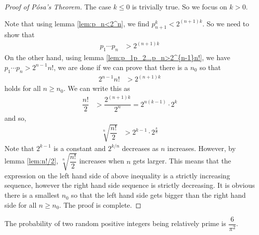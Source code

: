\documentclass{subfiles}
\begin{document}
	\begin{proof}[Proof of P\'osa's Theorem]
		The case $k\leq0$ is trivially true. So we focus on $k>0$.

		Note that using lemma \eqref{lem:p_n<2^n}, we find $p_{n+1}^k<2^{(n+1)k}$. So we need to show that
			\begin{align*}
				p_1\cdots p_n & > 2^{(n+1)k}
			\end{align*}
		On the other hand, using lemma \eqref{lem:p_1p_2...p_n>2^{n-1}n!}, we have $p_1\cdots p_n > 2^{n-1}n!$, we are done if we can prove that there is a $n_0$ so that
			\begin{align*}
				2^{n-1}n! & >2^{(n+1)k}
			\end{align*}
		holds for all $n\geq n_0$. We can write this as
			\begin{align*}
				\dfrac{n!}{2} & >\dfrac{2^{(n+1)k}}{2^n} =2^{n(k-1)}\cdot2^k
			\end{align*}
		and so,
			\begin{align*}
				\sqrt[n]{\dfrac{n!}{2}}&>2^{k-1}\cdot2^{\frac{k}{n}}
			\end{align*}
		Note that $2^{k-1}$ is a constant and $2^{k/n}$ decreases as $n$ increases. However, by lemma \eqref{lem:n!/2}, $\sqrt[n]{\dfrac{n!}{2}}$ increases when $n$ gets larger. This means that the expression on the left hand side of above inequality is a strictly increasing sequence, however the right hand side sequence is strictly decreasing. It is obvious there is a smallest $n_0$ so that the left hand side gets bigger than the right hand side for all $n\geq n_0$. The proof is complete.
	\end{proof}

	\begin{theorem}
		The probability of two random positive integers being relatively prime is $\dfrac{6}{\pi^2}$.
	\end{theorem}
\end{document}
